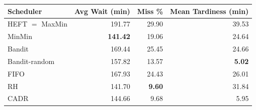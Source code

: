 \begin{tabular}{lrrr}
\toprule
\textbf{Scheduler} & \textbf{Avg Wait (min)} & \textbf{Miss \%} & \textbf{Mean Tardiness (min)} \\
\midrule
HEFT $=$ MaxMin & 191.77 & 29.90 & 39.53\\
MinMin & \textbf{141.42} & 19.06 & 24.64\\
Bandit & 169.44 & 25.45 & 24.66\\
Bandit-random & 157.82 & 13.57 & \textbf{5.02}\\
FIFO & 167.93 & 24.43 & 26.01\\
RH & 141.70 & \textbf{9.60} & 31.84\\
CADR & 144.66 & 9.68 & 5.95\\
\bottomrule
\end{tabular}
